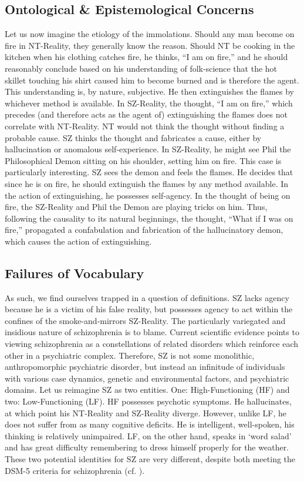 \documentclass[]{article}
\begin{document}
	\subsection{Ontological \& Epistemological Concerns}
	
		Let us now imagine the etiology of the immolations. Should any man become on fire in NT-Reality, they generally know the reason. Should NT be cooking in the kitchen when his clothing catches fire, he thinks, “I am on fire,” and he should reasonably conclude based on his understanding of folk-science that the hot skillet touching his shirt caused him to become burned and is therefore the agent. This understanding is, by nature, subjective. He then extinguishes the flames by whichever method is available. In SZ-Reality, the thought, “I am on fire,” which precedes (and therefore acts as the agent of) extinguishing the flames does not correlate with NT-Reality. NT would not think the thought without finding a probable cause. SZ thinks the thought and fabricates a cause, either by hallucination or anomalous self-experience. In SZ-Reality, he might see Phil the Philosophical Demon sitting on his shoulder, setting him on fire. This case is particularly interesting. SZ sees the demon and feels the flames. He decides that since he is on fire, he should extinguish the flames by any method available. In the action of extinguishing, he possesses self-agency. In the thought of being on fire, the SZ-Reality and Phil the Demon are playing tricks on him. Thus, following the causality to its natural beginnings, the thought, “What if I was on fire,” propagated a confabulation and fabrication of the hallucinatory demon, which causes the action of extinguishing.
		
	\subsection{Failures of Vocabulary}
		
		As such, we find ourselves trapped in a question of definitions. SZ lacks agency because he is a victim of his false reality, but possesses agency to act within the confines of the 
		smoke-and-mirrors SZ-Reality. The particularly variegated and insidious nature of schizophrenia is to blame. Current scientific evidence points to viewing schizophrenia as a constellations of related disorders which reinforce each other in a psychiatric complex. Therefore, SZ is not some monolithic, anthropomorphic psychiatric disorder, but instead an infinitude of individuals with various case dynamics, genetic and environmental factors, and psychiatric domains. Let us reimagine SZ as two entities. One: High-Functioning (HF) and two: Low-Functioning (LF). HF possesses psychotic symptoms. He hallucinates, at which point his NT-Reality and SZ-Reality diverge. However, unlike LF, he does not suffer from as many cognitive deficits. He is intelligent, well-spoken, his thinking is relatively unimpaired. LF, on the other hand, speaks in ‘word salad’ and has great difficulty remembering to dress himself properly for the weather. These two potential identities for SZ are very different, despite both meeting the DSM-5 criteria for schizophrenia (cf. \cite{RaballoSelfDisordersExperientialCore2012}).
		
\end{document}
